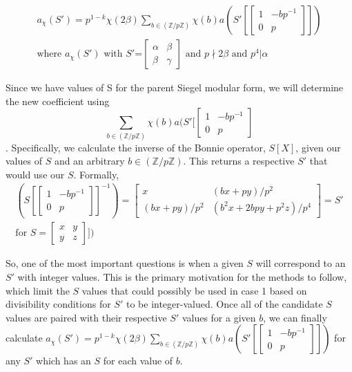 \documentclass[11pt, oneside]{amsart}
\begin{document}
\begin{align*}
a_\chi (S')=p^{1-k}\chi(2\beta)\sum_{b\in (\mathbb{Z}/p\mathbb{Z})}\chi(b)a(S'[
\begin{bmatrix}
1 &	-bp^{-1} \\
0 & p
\end{bmatrix}
])
\\
\text{where $a_\chi (S')$ with $S'$=}
\begin{bmatrix}
\alpha &	\beta \\
\beta & \gamma
\end{bmatrix}
\text{ and } p\nmid 2\beta \text{ and } p^4\vert \alpha
\end{align*}

Since we have values of S for the parent Siegel modular form, we will determine the new coefficient using $$\sum_{b\in (\mathbb{Z}/p\mathbb{Z})}\chi(b)a(S'[
\begin{bmatrix}
1 &	-bp^{-1} \\
0 & p
\end{bmatrix}$$. Specifically, we calculate the inverse of the Bonnie operator, $S[X]$, given our values of $S$ and an arbitrary $b \in (\mathbb{Z}/p\mathbb{Z})$. This returns a respective $S'$ that would use our $S$. Formally, 
\begin{align*}
(S[
\begin{bmatrix}
1 &	-bp^{-1} \\
0 & p
\end{bmatrix}
]^{-1})
= 
\begin{bmatrix}
x &	(bx +py)/p^2 \\
(bx+py)/p^2 & (b^2x+2bpy+p^2z)/p^4
\end{bmatrix}
 = S'
\\
\text{for } S=
\begin{bmatrix}
x &	y \\
y & z
\end{bmatrix}
])
\end{align*}

So, one of the most important questions is when a given $S$ will correspond to an $S'$ with integer values. This is the primary motivation for the methods to follow, which limit the $S$ values that could possibly be used in case 1 based on divisibility conditions for $S'$ to be integer-valued. Once all of the candidate $S$ values are paired with their respective $S'$ values for a given $b$, we can finally calculate $a_\chi (S')=p^{1-k}\chi(2\beta)\sum_{b\in (\mathbb{Z}/p\mathbb{Z})}\chi(b)a(S'[
\begin{bmatrix}
1 &	-bp^{-1} \\
0 & p
\end{bmatrix}
])$
for any $S'$ which has an $S$ for each value of $b$.
\end{document}
